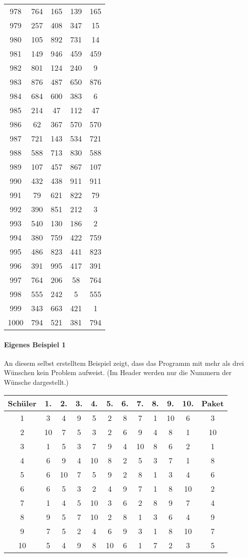 \documentclass[a4paper,10pt,ngerman]{scrartcl}
\begin{document}
\begin{longtable}[c]{c|c|c|c|c}
    978 & 764 & 165 & 139 & 165 \\
    979 & 257 & 408 & 347 & 15 \\
    980 & 105 & 892 & 731 & 14 \\
    981 & 149 & 946 & 459 & 459 \\
    982 & 801 & 124 & 240 & 9 \\
    983 & 876 & 487 & 650 & 876 \\
    984 & 684 & 600 & 383 & 6 \\
    985 & 214 & 47 & 112 & 47 \\
    986 & 62 & 367 & 570 & 570 \\
    987 & 721 & 143 & 534 & 721 \\
    988 & 588 & 713 & 830 & 588 \\
    989 & 107 & 457 & 867 & 107 \\
    990 & 432 & 438 & 911 & 911 \\
    991 & 79 & 621 & 822 & 79 \\
    992 & 390 & 851 & 212 & 3 \\
    993 & 540 & 130 & 186 & 2 \\
    994 & 380 & 759 & 422 & 759 \\
    995 & 486 & 823 & 441 & 823 \\
    996 & 391 & 995 & 417 & 391 \\
    997 & 764 & 206 & 58 & 764 \\
    998 & 555 & 242 & 5 & 555 \\
    999 & 343 & 663 & 421 & 1 \\
    1000 & 794 & 521 & 381 & 794
\end{longtable}

\paragraph{Eigenes Beispiel 1}
An diesem selbst erstelltem Beispiel zeigt, dass das Programm mit mehr als drei Wünschen kein Problem aufweist.
(Im Header werden nur die Nummern der Wünsche dargestellt.)
\begin{longtable}[c]{c|c|c|c|c|c|c|c|c|c|c|c}
    Schüler & 1. & 2. & 3. & 4. & 5. & 6. & 7. & 8. & 9. & 10. & Paket \\
    \hline
    \endhead
    1 & 3 & 4 & 9 & 5 & 2 & 8 & 7 & 1 & 10 & 6 & 3 \\
    2 & 10 & 7 & 5 & 3 & 2 & 6 & 9 & 4 & 8 & 1 & 10 \\
    3 & 1 & 5 & 3 & 7 & 9 & 4 & 10 & 8 & 6 & 2 & 1 \\
    4 & 6 & 9 & 4 & 10 & 8 & 2 & 5 & 3 & 7 & 1 & 8 \\
    5 & 6 & 10 & 7 & 5 & 9 & 2 & 8 & 1 & 3 & 4 & 6 \\
    6 & 6 & 5 & 3 & 2 & 4 & 9 & 7 & 1 & 8 & 10 & 2 \\
    7 & 1 & 4 & 5 & 10 & 3 & 6 & 2 & 8 & 9 & 7 & 4 \\
    8 & 9 & 5 & 7 & 10 & 2 & 8 & 1 & 3 & 6 & 4 & 9 \\
    9 & 7 & 5 & 2 & 4 & 6 & 9 & 3 & 1 & 8 & 10 & 7 \\
    10 & 5 & 4 & 9 & 8 & 10 & 6 & 1 & 7 & 2 & 3 & 5
\end{longtable}
\end{document}
